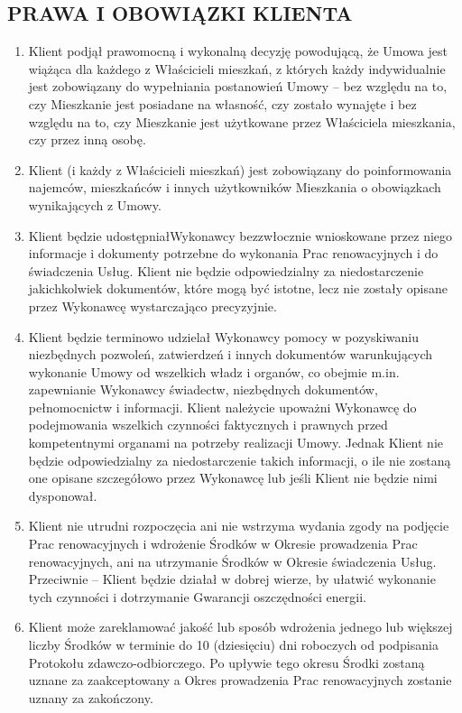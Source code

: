 \begin{multicols}{2}
\subsection{PRAWA I OBOWIĄZKI KLIENTA}
\begin{enumerate}
	\item Klient podjął prawomocną i wykonalną decyzję powodującą, że Umowa jest wiążąca dla każdego z Właścicieli mieszkań, z których każdy indywidualnie jest zobowiązany do wypełniania postanowień Umowy – bez względu na to, czy Mieszkanie jest posiadane na własność, czy zostało wynajęte i bez względu na to, czy Mieszkanie jest użytkowane przez Właściciela mieszkania, czy przez inną osobę.
	\item Klient (i każdy z Właścicieli mieszkań) jest zobowiązany do poinformowania najemców, mieszkańców i innych użytkowników Mieszkania o obowiązkach wynikających z Umowy.
	\item Klient będzie udostępniałWykonawcy bezzwłocznie wnioskowane przez niego informacje i dokumenty potrzebne do wykonania Prac renowacyjnych i do świadczenia Usług. Klient nie będzie odpowiedzialny za niedostarczenie jakichkolwiek dokumentów, które mogą być istotne, lecz nie zostały opisane przez Wykonawcę wystarczająco precyzyjnie.
	\item Klient będzie terminowo udzielał Wykonawcy pomocy w pozyskiwaniu niezbędnych pozwoleń, zatwierdzeń i innych dokumentów warunkujących wykonanie Umowy od wszelkich władz i organów, co obejmie m.in. zapewnianie Wykonawcy świadectw, niezbędnych dokumentów, pełnomocnictw i informacji. Klient należycie upoważni Wykonawcę do podejmowania wszelkich czynności faktycznych i prawnych przed kompetentnymi organami na potrzeby realizacji Umowy. Jednak Klient nie będzie odpowiedzialny za niedostarczenie takich informacji, o ile nie zostaną one opisane szczegółowo przez Wykonawcę lub jeśli Klient nie będzie nimi dysponował.
	\item Klient nie utrudni rozpoczęcia ani nie wstrzyma wydania zgody na podjęcie Prac renowacyjnych i wdrożenie Środków w Okresie prowadzenia Prac renowacyjnych, ani na utrzymanie Środków w Okresie świadczenia Usług. Przeciwnie – Klient będzie działał w dobrej wierze, by ułatwić wykonanie tych czynności i dotrzymanie Gwarancji oszczędności energii.
	\item Klient może zareklamować jakość lub sposób wdrożenia jednego lub większej liczby Środków w terminie do 10 (dziesięciu) dni roboczych od podpisania Protokołu zdawczo-odbiorczego. Po upływie tego okresu Środki zostaną uznane za zaakceptowany a Okres prowadzenia Prac renowacyjnych zostanie uznany za zakończony.

\end{enumerate}
\end{multicols}
